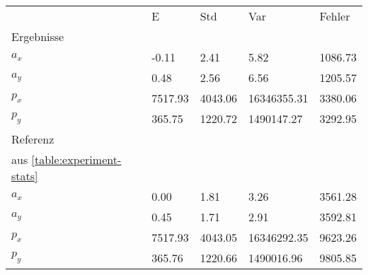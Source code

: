 \begin{tabular}{l|l|l|l|l}

     & E   & Std    & Var    & Fehler \\
\hhline{=|=|=|=|=}

Ergebnisse & & & & \\
$a_x$  &        -0.11 &         2.41 &         5.82 &      1086.73 \\
$a_y$  &         0.48 &         2.56 &         6.56 &      1205.57 \\
$p_x$  &      7517.93 &      4043.06 &  16346355.31 &      3380.06 \\
$p_y$  &       365.75 &      1220.72 &   1490147.27 &      3292.95 \\

\hline
Referenz & & & & \\
aus \ref{table:experiment-stats} & & & & \\
$a_x$  &         0.00 &         1.81 &         3.26 &      3561.28 \\
$a_y$  &         0.45 &         1.71 &         2.91 &      3592.81 \\
$p_x$  &      7517.93 &      4043.05 &  16346292.35 &      9623.26 \\
$p_y$  &       365.76 &      1220.66 &   1490016.96 &      9805.85 \\
\end{tabular}
